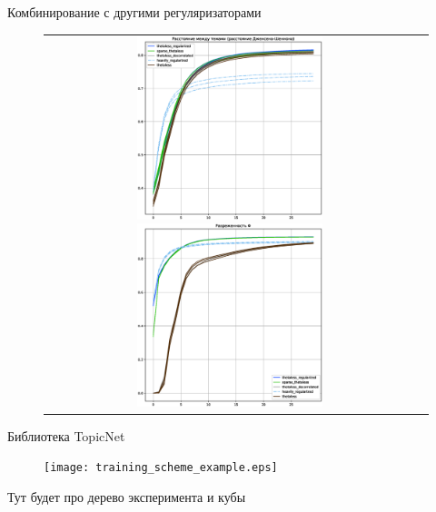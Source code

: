 \begin{frame}{Комбинирование с другими регуляризаторами}

\begin{figure}
\setlength\tabcolsep{0pt} %
\begin{tabular}{cc}
\includegraphics[width=54mm]{images/CH4_improved_diversity_jensenshannon_False.eps}
\includegraphics[width=54mm]{images/CH4_improved_SparsityPhiScore.eps}& \end{tabular}
\end{figure}
\end{frame}


\begin{frame}{Библиотека TopicNet}

\begin{figure}[ht]
    \centering
    \texttt{[image: training\_scheme\_example.eps]}
\end{figure} 
	Тут будет про дерево эксперимента и кубы
\end{frame}



